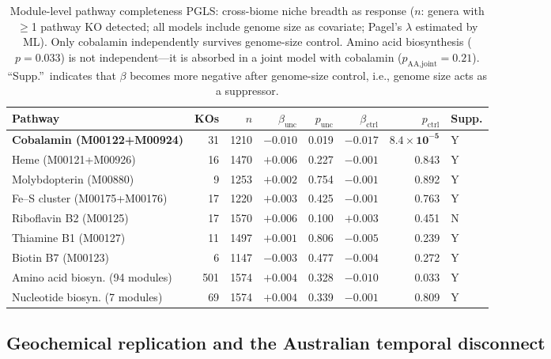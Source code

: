 \documentclass[times]{zHenriquesLab-StyleBioRxiv}
\begin{document}
\begin{table}[htbp]
\caption{Module-level pathway completeness PGLS: cross-biome niche breadth
as response ($n$: genera with $\geq$1 pathway KO detected; all models include
genome size as covariate; Pagel's $\lambda$ estimated by ML). Only cobalamin
independently survives genome-size control. Amino acid biosynthesis ($p = 0.033$)
is not independent---it is absorbed in a joint model with cobalamin
($p_{\text{AA,joint}} = 0.21$). ``Supp.''~indicates that $\beta$ becomes more
negative after genome-size control, i.e., genome size acts as a suppressor.}
\label{tab:pathway_completeness}
\centering
\small
\begin{tabular}{lrrrrrrl}
\toprule
Pathway & KOs & $n$ & $\beta_\text{unc}$ & $p_\text{unc}$ & $\beta_\text{ctrl}$ & $p_\text{ctrl}$ & Supp. \\
\midrule
\textbf{Cobalamin (M00122+M00924)} & 31 & 1210 & $-0.010$ & 0.019 & $\mathbf{-0.017}$ & $\mathbf{8.4 \times 10^{-5}}$ & Y \\
Heme (M00121+M00926) & 16 & 1470 & $+0.006$ & 0.227 & $-0.001$ & 0.843 & Y \\
Molybdopterin (M00880) & 9 & 1253 & $+0.002$ & 0.754 & $-0.001$ & 0.892 & Y \\
Fe--S cluster (M00175+M00176) & 17 & 1220 & $+0.003$ & 0.425 & $-0.001$ & 0.763 & Y \\
Riboflavin B2 (M00125) & 17 & 1570 & $+0.006$ & 0.100 & $+0.003$ & 0.451 & N \\
Thiamine B1 (M00127) & 11 & 1497 & $+0.001$ & 0.806 & $-0.005$ & 0.239 & Y \\
Biotin B7 (M00123) & 6 & 1147 & $-0.003$ & 0.477 & $-0.004$ & 0.272 & Y \\
Amino acid biosyn. (94 modules) & 501 & 1574 & $+0.004$ & 0.328 & $-0.010$ & 0.033 & Y \\
Nucleotide biosyn. (7 modules) & 69 & 1574 & $+0.004$ & 0.339 & $-0.001$ & 0.809 & Y \\
\bottomrule
\end{tabular}
\end{table}


\subsection{Geochemical replication and the Australian temporal disconnect}
\label{ss:georeplication}
\end{document}
